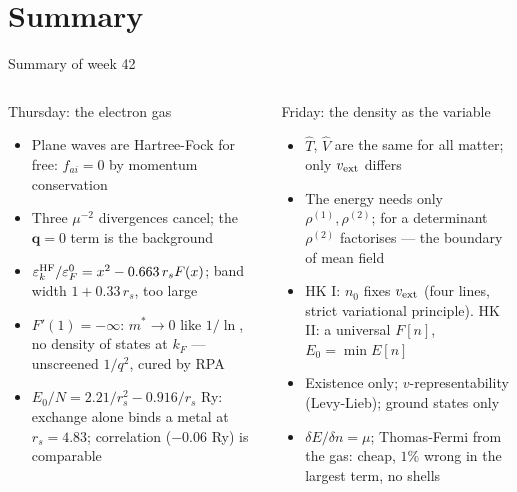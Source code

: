 \documentclass[aspectratio=169,10pt]{beamer}
\begin{document}
\section{Summary}

\begin{frame}{Summary of week 42}
  \small
  \begin{columns}[T]
    \begin{block}{Thursday: the electron gas}
      \begin{itemize}
        \item Plane waves are Hartree-Fock for free: $f_{ai}=0$ by momentum conservation
        \item Three $\mu^{-2}$ divergences cancel; the $\bm q=0$ term is the background
        \item $\varepsilon_k^{\rm HF}/\varepsilon_F^0=x^2-0.663\,r_sF(x)$; band width $1+0.33\,r_s$, too large
        \item $F'(1)=-\infty$: $m^{*}\to0$ like $1/\ln$, no density of states at $k_F$ --- unscreened $1/q^2$, cured by RPA
        \item $E_0/N=2.21/r_s^2-0.916/r_s$ Ry: exchange alone binds a metal at $r_s=4.83$; correlation ($-0.06$ Ry) is comparable
      \end{itemize}
    \end{block}
    \begin{block}{Friday: the density as the variable}
      \begin{itemize}
        \item $\hat T$, $\hat V$ are the same for all matter; only $v_{\rm ext}$ differs
        \item The energy needs only $\rho^{(1)},\rho^{(2)}$; for a determinant $\rho^{(2)}$ factorises --- the boundary of mean field
        \item HK I: $n_0$ fixes $v_{\rm ext}$ (four lines, strict variational principle). HK II: a universal $F[n]$, $E_0=\min E[n]$
        \item Existence only; $v$-representability (Levy-Lieb); ground states only
        \item $\delta E/\delta n=\mu$; Thomas-Fermi from the gas: cheap, $1\%$ wrong in the largest term, no shells
      \end{itemize}
    \end{block}
  \end{columns}
\end{frame}
\end{document}
